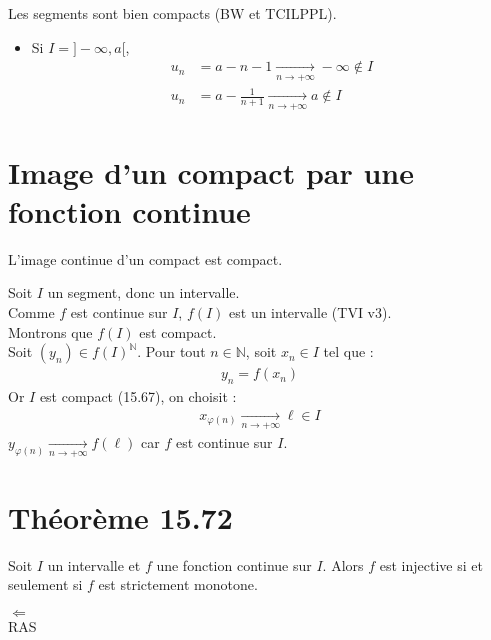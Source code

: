 \documentclass[../main.tex]{subfiles}
\begin{document}
Les segments sont bien compacts (BW et TCILPPL). \\
\begin{itemize}
    \item Si $I = ]-\infty, a[$, 
    \begin{align*}
        u_n &= a-n-1 \underset{n \to +\infty}{\longrightarrow} -\infty \not\in I \\
        u_n &= a - \frac{1}{n+1} \underset{n \to +\infty}{\longrightarrow} a \not\in I
    \end{align*} 
\end{itemize}

\section{Image d'un compact par une fonction continue}
\begin{tcolorbox}[title=Lemme 15.68, title filled=false, colframe=orange, colback=orange!10!white]
    L'image continue d'un compact est compact. 
\end{tcolorbox}

Soit $I$ un segment, donc un intervalle. \\
Comme $f$ est continue sur $I$, $f(I)$ est un intervalle (TVI v3). \\
Montrons que $f(I)$ est compact. \\
Soit $(y_n) \in f(I)^{\mathbb{N}}$. Pour tout $n \in \mathbb{N}$, soit $x_n \in I$ tel que : 
\begin{align*}
    y_n = f(x_n)
\end{align*}
Or $I$ est compact (15.67), on choisit : 
\begin{align*}
    x_{\varphi(n)} \underset{n \to +\infty}{\longrightarrow} \ell \in I
\end{align*}
$y_{\varphi(n)} \underset{n \to +\infty}{\longrightarrow} f(\ell)$ car $f$ est continue sur $I$. 

\setcounter{section}{71}
\section{Théorème 15.72}
\begin{tcolorbox}[title=Théorème 15.72, title filled=false, colframe=orange, colback=orange!10!white]
    Soit $I$ un intervalle et $f$ une fonction continue sur $I$. Alors $f$ est injective si et seulement si $f$ est strictement monotone. 
\end{tcolorbox}

$\boxed{\Leftarrow}$ \\
RAS \\ \\
\end{document}
